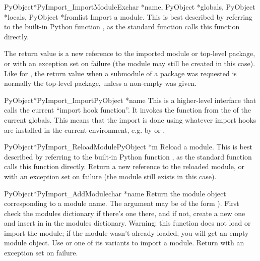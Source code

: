 \documentclass{manual}
\begin{document}
\begin{cfuncdesc}{PyObject*}{PyImport_ImportModuleEx}{char *name, PyObject *globals, PyObject *locals, PyObject *fromlist}
Import a module.  This is best described by referring to the built-in
Python function , as
the standard  function calls this function
directly.

The return value is a new reference to the imported module or
top-level package, or \NULL{} with an exception set on failure
(the module may still be created in this case).  Like for
, the return value when a submodule of a
package was requested is normally the top-level package, unless a
non-empty  was given.
\end{cfuncdesc}

\begin{cfuncdesc}{PyObject*}{PyImport_Import}{PyObject *name}
This is a higher-level interface that calls the current ``import hook
function''.  It invokes the  function from the
 of the current globals.  This means that the
import is done using whatever import hooks are installed in the
current environment, e.g. by  or
.
\end{cfuncdesc}

\begin{cfuncdesc}{PyObject*}{PyImport_ReloadModule}{PyObject *m}
Reload a module.  This is best described by referring to the built-in
Python function , as the standard
 function calls this function directly.  Return a
new reference to the reloaded module, or \NULL{} with an exception set
on failure (the module still exists in this case).
\end{cfuncdesc}

\begin{cfuncdesc}{PyObject*}{PyImport_AddModule}{char *name}
Return the module object corresponding to a module name.  The
 argument may be of the form ).  First
check the modules dictionary if there's one there, and if not, create
a new one and insert in in the modules dictionary.
Warning: this function does not load or import the module; if the
module wasn't already loaded, you will get an empty module object.
Use  or one of its variants to
import a module.
Return \NULL{} with an exception set on failure.
\end{cfuncdesc}
\end{document}
